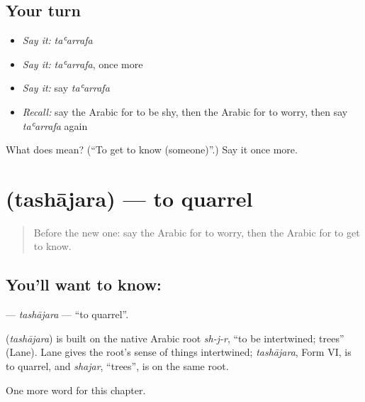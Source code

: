 \subsection*{Your turn}
\begin{itemize}
\raggedright
  \item \emph{Say it:} \emph{taʿarrafa}
  \item \emph{Say it:} \emph{taʿarrafa}, once more
  \item \emph{Say it:} say \emph{taʿarrafa}
  \item \emph{Recall:} say the Arabic for to be shy, then the Arabic for to worry, then say \emph{taʿarrafa} again
\end{itemize}

\begin{tcolorbox}[breakable,colback=teal!4,colframe=teal!35!black,title={Before you move on}]
What does  mean? (\textquotedblleft{}To get to know (someone)\textquotedblright{}.) Say it once more.
\end{tcolorbox}
\section[\texorpdfstring{\ar{تشاجر} (tashājara)}{تشاجر (tashājara)}]{ (tashājara) — to quarrel}

\label{lesson:AR-C227-tashajara}



\begin{quote}
Before the new one: say the Arabic for to worry, then the Arabic for to get to know.
\end{quote}

\subsection*{You'll want to know: }
\textbf{} — \emph{tashājara} — \textquotedblleft{}to quarrel\textquotedblright{}.

\begin{cousinweb}
\textbf{} (\emph{tashājara}) is built on the native Arabic root \emph{sh-j-r}, \textquotedblleft{}to be intertwined; trees\textquotedblright{} (Lane). Lane gives the root's sense of things intertwined; \emph{tashājara}, Form VI, is to quarrel, and \emph{shajar}, \textquotedblleft{}trees\textquotedblright{}, is on the same root.
\end{cousinweb}

\begin{grammarlens}[title={What you've built}]
One more word for this chapter.
\end{grammarlens}

